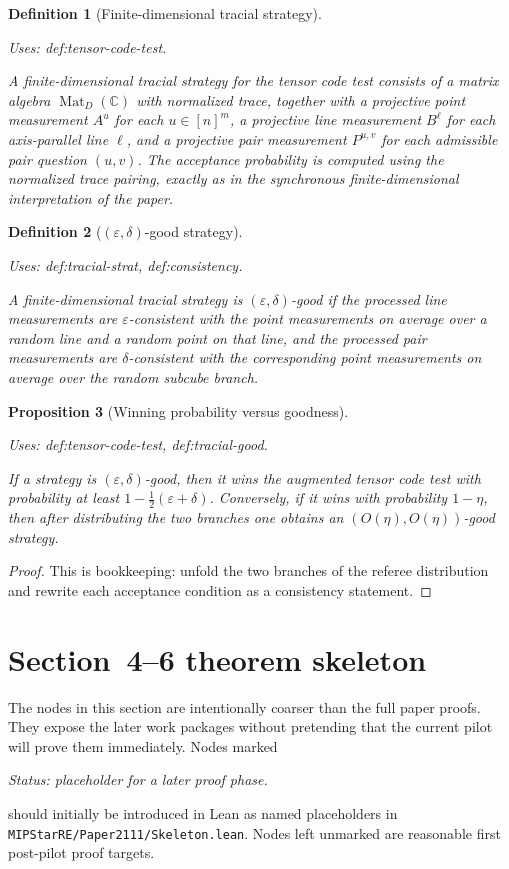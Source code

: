 \documentclass{article}
\providecommand{\uses}[1]{\par\smallskip\noindent\emph{Uses:} #1.\par\smallskip}
\providecommand{\notready}{\par\smallskip\noindent\emph{Status: placeholder for a later proof phase.}\par\smallskip}
\newtheorem{definition}{Definition}[section]
\newtheorem{proposition}[definition]{Proposition}
\theoremstyle{remark}
\newcommand{\C}{\mathbb{C}}
\newcommand{\Mat}{\operatorname{Mat}}
\newcommand{\eps}{\varepsilon}
\begin{document}
\begin{definition}[Finite-dimensional tracial strategy]\label{def:tracial-strat}
  \uses{def:tensor-code-test}
  A finite-dimensional tracial strategy for the tensor code test consists of a matrix algebra $\Mat_D(\C)$ with normalized trace, together with a projective point measurement $A^u$ for each $u\in [n]^m$, a projective line measurement $B^\ell$ for each axis-parallel line $\ell$, and a projective pair measurement $P^{u,v}$ for each admissible pair question $(u,v)$. The acceptance probability is computed using the normalized trace pairing, exactly as in the synchronous finite-dimensional interpretation of the paper.
\end{definition}

\begin{definition}[$(\eps,\delta)$-good strategy]\label{def:tracial-good}
  \uses{def:tracial-strat, def:consistency}
  A finite-dimensional tracial strategy is \emph{$(\eps,\delta)$-good} if the processed line measurements are $\eps$-consistent with the point measurements on average over a random line and a random point on that line, and the processed pair measurements are $\delta$-consistent with the corresponding point measurements on average over the random subcube branch.
\end{definition}

\begin{proposition}[Winning probability versus goodness]\label{prop:test-goodness}
  \uses{def:tensor-code-test, def:tracial-good}
  If a strategy is $(\eps,\delta)$-good, then it wins the augmented tensor code test with probability at least $1-\tfrac12(\eps+\delta)$. Conversely, if it wins with probability $1-\eta$, then after distributing the two branches one obtains an $(O(\eta),O(\eta))$-good strategy.
\end{proposition}
\begin{proof}
  This is bookkeeping: unfold the two branches of the referee distribution and rewrite each acceptance condition as a consistency statement.
\end{proof}

\section{Section~4--6 theorem skeleton}

The nodes in this section are intentionally coarser than the full paper proofs. They expose the later work packages without pretending that the current pilot will prove them immediately. Nodes marked \notready should initially be introduced in Lean as named placeholders in \texttt{MIPStarRE/Paper2111/Skeleton.lean}. Nodes left unmarked are reasonable first post-pilot proof targets.
\end{document}
